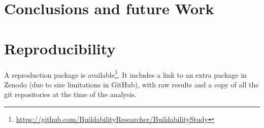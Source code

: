 \section{Conclusions and future Work}
\label{sec:buildability:conclusions}


\section*{Reproducibility}
\label{sec:buildability:repro}

A reproduction package is available\footnote{\url{https://github.com/BuildabilityResearcher/BuildabilityStudy}}. It includes a link to an extra package in Zenodo (due to size limitations in GitHub), with raw results and a copy of all the git repositories at the time of the analysis.
